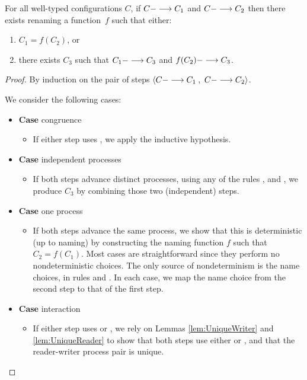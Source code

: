\begin{theorem}\label{lem:single-step-confluence}
For all well-typed configurations $C$,
%
 if $C ---> C_1$ 
and $C ---> C_2$ 
then 
there exists renaming a function~$f$ 
such that either:
\begin{enumerate}
\item %
$C_1 = f(C_2)$,
or
\item there exists $C_3$ such that $C_1 ---> C_3$ and $f(C_2) ---> C_3$.
\end{enumerate}
\begin{proof}
   By induction on the pair of steps 
   $\left< C ---> C_1\right.$, 
   $\left.C ---> C_2 \right>$.

   We consider the following cases:
   \begin{itemize}[leftmargin=*]
   \item[] \textbf{Case} congruence
     \begin{itemize}[leftmargin=*]
       \item[] If either step uses , we apply
     the inductive hypothesis.
     \end{itemize}     

   \item[] \textbf{Case} independent processes
     \begin{itemize}[leftmargin=*]
       \item[] If both steps advance distinct processes, using any of the rules
         ,  and , we produce $C_3$ by combining
         those two (independent) steps.
     \end{itemize}


   \item[] \textbf{Case} one process
     \begin{itemize}[leftmargin=*]
       \item[] If both steps advance the same process, we show that this is
         deterministic (up to naming) by constructing the naming function $f$
         such that $C_2 = f(C_1)$.  Most cases are straightforward since they
         perform no nondeterministic choices.  The only source of nondeterminism
         is the name choices, in rules  and . In each case,
         we map the name choice from the second step to that of the first step.
     \end{itemize}

   \item[] \textbf{Case} interaction
     \begin{itemize}[leftmargin=*]
       \item[] If either step uses  or , we rely on Lemmas
         \ref{lem:UniqueWriter} and \ref{lem:UniqueReader} to show that both
         steps use either  or , and that the reader-writer
         process pair is unique.
     \end{itemize}
   \end{itemize}
\end{proof}
\end{theorem}

